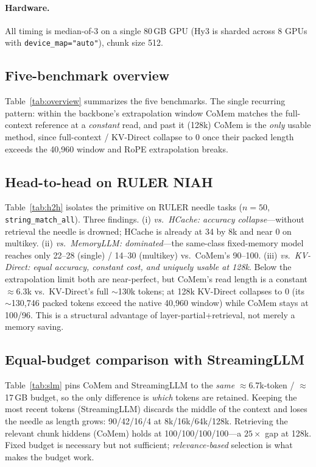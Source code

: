 \paragraph{Hardware.} All timing is median-of-3 on a single 80\,GB GPU (Hy3 is
sharded across 8 GPUs with \texttt{device\_map="auto"}), chunk size 512.

\subsection{Five-benchmark overview}
Table~\ref{tab:overview} summarizes the five benchmarks. The single recurring
pattern: within the backbone's extrapolation window CoMem matches the
full-context reference at a \emph{constant} read, and past it (128k) CoMem is
the \emph{only} usable method, since full-context / KV-Direct collapse to 0
once their packed length exceeds the 40{,}960 window and RoPE extrapolation
breaks.



\subsection{Head-to-head on RULER NIAH}
Table~\ref{tab:h2h} isolates the primitive on RULER needle tasks ($n{=}50$,
\texttt{string\_match\_all}). Three findings. (i) \emph{vs.\ HCache: accuracy
collapse}---without retrieval the needle is drowned; HCache is already at 34 by
8k and near 0 on multikey. (ii) \emph{vs.\ MemoryLLM: dominated}---the
same-class fixed-memory model reaches only 22--28 (single) / 14--30 (multikey)
vs.\ CoMem's 90--100. (iii) \emph{vs.\ KV-Direct: equal accuracy, constant cost,
and uniquely usable at 128k}. Below the extrapolation limit both are
near-perfect, but CoMem's read length is a constant $\approx$6.3k vs.\
KV-Direct's full $\sim$130k tokens; at 128k KV-Direct collapses to 0 (its
$\sim$130{,}746 packed tokens exceed the native 40{,}960 window) while CoMem
stays at 100/96. This is a structural advantage of layer-partial{+}retrieval,
not merely a memory saving.



\subsection{Equal-budget comparison with StreamingLLM}
Table~\ref{tab:slm} pins CoMem and StreamingLLM to the \emph{same}
$\approx$6.7k-token / $\approx$17\,GB budget, so the only difference is
\emph{which} tokens are retained. Keeping the most recent tokens
(StreamingLLM) discards the middle of the context and loses the needle as
length grows: 90/42/16/4 at 8k/16k/64k/128k. Retrieving the relevant chunk
hiddens (CoMem) holds at 100/100/100/100---a $25\times$ gap at 128k. Fixed budget
is necessary but not sufficient; \emph{relevance-based} selection is what makes
the budget work.

